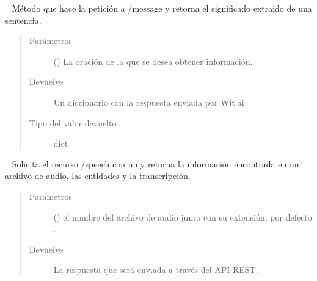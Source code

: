 \begin{fulllineitems}
\begin{fulllineitems}
\label{\detokenize{chapter_two/desc_cloudnao:app.tpa_client_libraries.wit_api.WitAPI.message}}~
Método que hace la petición  a /message y retorna el significado
extraido de una sentencia.
\begin{quote}\begin{description}
\item[{Parámetros}] \leavevmode
{} () \textendash{} La oración de la que se desea obtener información.

\item[{Devuelve}] \leavevmode
Un diccionario con la respuesta enviada por Wit.ai

\item[{Tipo del valor devuelto}] \leavevmode
dict

\end{description}\end{quote}

\end{fulllineitems}


\begin{fulllineitems}
\label{\detokenize{chapter_two/desc_cloudnao:app.tpa_client_libraries.wit_api.WitAPI.speech}}~
Solicita el recurso /speech con un  y retorna la información
encontrada en un archivo de audio, las entidades y la transcripción.
\begin{quote}\begin{description}
\item[{Parámetros}] \leavevmode
{} () \textendash{} el nombre del archivo de audio junto con su extensión, por defecto .

\item[{Devuelve}] \leavevmode
La respuesta que será enviada a través del API REST.

\end{description}\end{quote}

\end{fulllineitems}


\end{fulllineitems}



